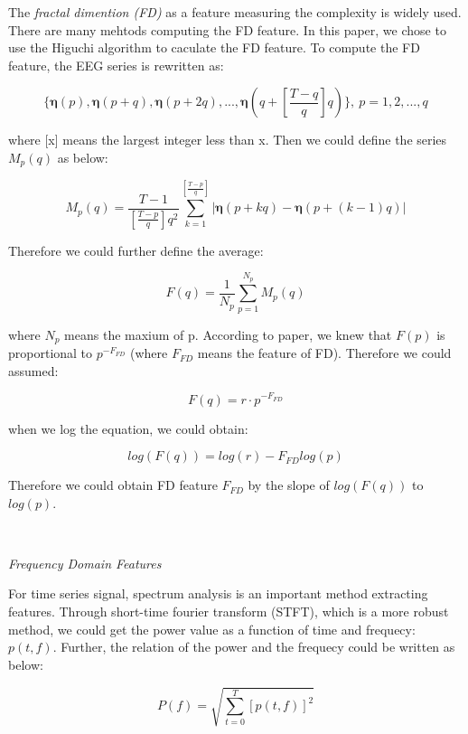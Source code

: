 \documentclass[runningheads,a4paper]{llncs}
\begin{document}
The \emph{fractal dimention (FD)} as a feature measuring the complexity is widely used.
There are many mehtods computing the FD feature. In this paper, we chose to use
the Higuchi algorithm\cite{FD} to caculate the FD feature. To compute the FD
feature, the EEG series is rewritten as:

\begin{equation}
    \{{\bm{\eta}}(p), {\bm{\eta}}(p+q), {\bm{\eta}}(p+2q), ... , {\bm{\eta}}(q+[\frac{T-q}{q}]q)\},\ p = 1,2,...,q
\end{equation}

where [x] means the largest integer less than x. Then we could define the series $M_p(q)$ as below:

\begin{equation}
  M_p(q) = \frac{T-1}{[\frac{T-p}{q}]q^2}\sum_{k=1}^{[\frac{T-p}{q}]}|{\bm{\eta}}(p+kq) - {\bm{\eta}}(p+(k-1)q)|
\end{equation}

 Therefore we could further define the average:

\begin{equation}
  F(q) = \frac{1}{N_p}\sum_{p=1}^{N_p}M_p(q)
\end{equation}

where $N_p$ means the maxium of p.
According to paper\cite{FD}, we knew that $F(p)$ is proportional to $p^{-F_{FD}}$
(where $F_{FD}$ means the feature of FD). Therefore we could assumed:

\begin{equation}
   F(q) = r\cdot{p^{-F_{FD}}}
\end{equation}

when we log the equation, we could obtain:

\begin{equation}
  log(F(q)) = log(r) - {F_{FD}}log(p)
\end{equation}

Therefore we could obtain FD feature $F_{FD}$ by the slope of $log(F(q))$ to $log(p)$.

\

\emph{Frequency Domain Features}

For time series signal, spectrum analysis is an important method extracting features.
Through short-time fourier transform (STFT)\cite{STFT}, which is a more robust method,
we could get the power value as a function of time and frequecy: $p(t,f)$. Further,
the relation of the power and the frequecy could be written as below:

\begin{equation}
    P(f) = \sqrt{\sum_{t=0}^{T}[p(t,f)]^2}
\end{equation}
\end{document}
